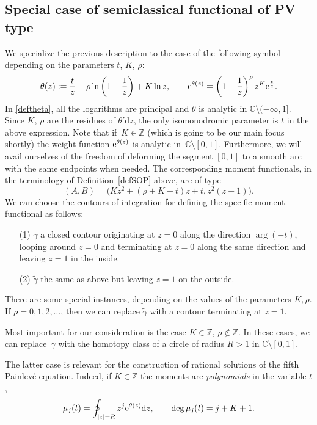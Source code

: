 \documentclass[10pt,a4paper]{amsart}
\numberwithin{equation}{section}
\theoremstyle{definition}
\def\le{\left}
\def\ri{\right}
\def \wt{ \widetilde }
\def \d{{\mathrm d}}
\def\be{\begin{equation}}
\def\ee{\end{equation}}
\def\C{{\mathbb C}}
\def\Z{{\mathbb Z}}
\def\la{\label}
\begin{document}
\subsection{Special case of semiclassical functional of PV type}
We specialize the previous description to the case of the following symbol depending on the parameters $t$, ${ {K}}$, ${ {\rho}}$:
\be
\label{deftheta}
{\theta(z)} := \frac t z +{ {\rho}} \ln \le(1- \frac 1 z\ri) + { {K}} \ln z, \qquad {\rm e}^{\theta(z)} = \le(1 - \frac 1 z\ri)^{ {\rho}} z^{{ {K}}} {\rm e}^{\frac t z}.
\ee
In \eqref{deftheta}, all the logarithms are principal and $\theta$ is analytic in $\C\setminus (-\infty, 1]$.
Since ${K}$, $ {\rho}$ are the residues of $\theta'\d z$, the only isomonodromic parameter is $t$ in the above expression.
 Note that if~${ {K}} \in \Z$ (which is going to be our main focus shortly) the weight function ${\rm e}^{\theta(z)}$ is analytic in~${\C\setminus [0,1]}$. Furthermore, we will avail ourselves of the freedom of deforming the segment $[0,1]$ to a smooth arc with the same endpoints when needed.
The corresponding moment functionals, in the terminology of Definition~\ref{defSOP} above, are of type
\be
(A,B) = \bigl({ {K}} z^2 + ({ {\rho}} + { {K}}+t)z + t, z^2(z-1)\bigr).
\la{AB}
\ee
We can choose the contours of integration for defining the specific moment functional as follows:%
\begin{enumerate}\itemsep=0pt
\item[(1)] $ \gamma$ a closed contour originating at $z=0$ along the direction $\arg (-t)$, looping around $z=0$ and terminating at $z=0$ along the same direction and leaving $z=1$ in the inside.
\item[(2)] $\wt \gamma$ the same as above but leaving $z=1$ on the outside.
\end{enumerate}
There are some special instances, depending on the values of the parameters ${ {K}}, { {\rho}}$. If ${ {\rho}}=0,1,2,\dots $, then we can replace $\wt \gamma$ with a contour terminating at $z=1$.

Most important for our consideration is the case ${K} \in \Z$, ${ {\rho}} \not\in \Z$. In these cases, we can replace~$\gamma$ with the homotopy class of a circle of radius $R>1$ in $\C\setminus [0,1]$.

The latter case is relevant for the construction of rational solutions of the fifth Painlev\'e equation. Indeed, if ${K}\in \Z$ the moments are {\it polynomials} in the variable $t$,
\be
\la{defmuj}
\mu_j(t) = \oint_{|z|=R} z^j {\rm e}^{\theta(z)}\d z, \qquad \deg \mu_j (t) = j+{K}+1.
\ee
\end{document}
